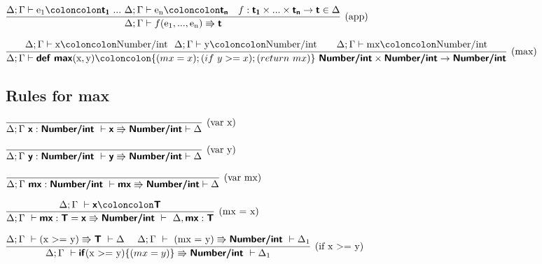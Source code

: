 \documentclass[a4paper]{article}
\newcommand{\kw}[1]{\textsf{\textbf{#1}}}
\newcommand{\colcol}{\coloncolon}
\newcommand{\yield}{\Rrightarrow}
\begin{document}
\vspace{3\baselineskip}

$\infer[\text{(app)}]%
{\Delta;\Gamma \vdash f(\textrm{e}_\textrm{1},...,\textrm{e}_\textrm{n}) \yield \kw{t}}%
{\Delta;\Gamma \vdash \textrm{e}_\textrm{1} \colcol \kw{t}_\kw{1}~...~ \Delta;\Gamma \vdash \textrm{e}_\textrm{n} \colcol \kw{t}_\kw{n} & f:\kw{t}_\kw{1}\times ... \times\kw{t}_\kw{n}\rightarrow\kw{t}\in \Delta}$

\vspace{3\baselineskip}

$\infer[\text{(max)}]%
{\Delta;\Gamma \vdash \kw{def}~\kw{max}(\textrm{x},\textrm{y}) \colcol \{(mx = x);(if~y>=x); (return~mx)\} ~ \kw{Number/int}\times\kw{Number/int}\rightarrow\kw{Number/int}}%
{\Delta;\Gamma \vdash \textrm{x} \colcol \textrm{Number/int}~~ \Delta;\Gamma \vdash\textrm{y} \colcol \textrm{Number/int}&&
\Delta;\Gamma \vdash\textrm{mx} \colcol \textrm{Number/int}}$

\vspace{3\baselineskip}

\subsection{Rules for max}

\vspace{2\baselineskip}

$\infer[\text{(var x)}]%
{\Delta;\Gamma~ \kw{x}:\kw{Number/int}~ \vdash \kw{x} \yield \kw{Number/int} \vdash\Delta}%
{}$

\vspace{2\baselineskip}

$\infer[\text{(var y)}]%
{\Delta;\Gamma~ \kw{y}:\kw{Number/int}~ \vdash \kw{y} \yield \kw{Number/int} \vdash\Delta}%
{}$

\vspace{2\baselineskip}

$\infer[\text{(var mx)}]%
{\Delta;\Gamma~ \kw{mx}:\kw{Number/int}~ \vdash \kw{mx} \yield \kw{Number/int} \vdash\Delta}%
{}$

\vspace{2\baselineskip}

$\infer[\text{(mx = x)}]%
{\Delta;\Gamma~\vdash \kw{mx} : \kw{T} = \kw{x} \yield \kw{Number/int}~ \vdash~\Delta,\kw{mx}:\kw{T} }%
{\Delta; \Gamma~\vdash \kw{x}\colcol\kw{T}}$

\vspace{2\baselineskip}

$\infer[\text{(if x \textgreater= y)}]%
{\Delta;\Gamma~\vdash \kw{if} \text{(x \textgreater= y)} \{(mx = y)\} \yield \kw{Number/int}~ \vdash\Delta_\textrm{1}}%
{\Delta; \Gamma~\vdash \text{(x \textgreater= y)} \yield \kw{T}~\vdash\Delta ~~~~ \Delta; \Gamma~\vdash~\text{(mx = y)}\yield \kw{Number/int}~\vdash\Delta_\textrm{1}}$
\end{document}
